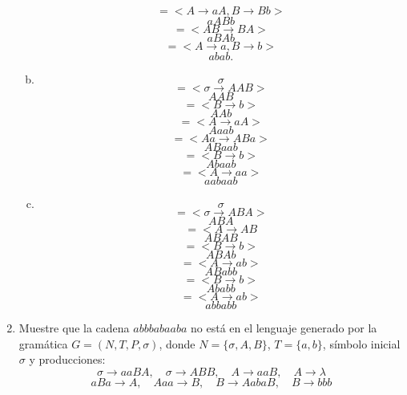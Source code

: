 \documentclass{article}
\begin{document}
\begin{enumerate}[1.]
\begin{enumerate}[a)]
        \[ = <A \rightarrow aA, B \rightarrow Bb>\]
        \[ aABb \]
        \[ = < AB \rightarrow BA > \]
        \[ aBAb \]
        \[ = <A \rightarrow a, B \rightarrow b> \]
        \[ abab. \] 
      \item
        \[ \sigma \]
        \[ = < \sigma \rightarrow AAB > \]
        \[ AAB \]
        \[ =< B \rightarrow b > \]
        \[ AAb \]
        \[ = < A \rightarrow aA > \]
        \[ Aaab \]
        \[ = < Aa \rightarrow ABa > \]
        \[ ABaab \]
        \[ = <B \rightarrow b> \]
        \[ Abaab \]
        \[ =<A \rightarrow aa> \]
        \[ aabaab \]
      \item
        \[ \sigma \]
        \[ = < \sigma \rightarrow ABA >  \]
        \[ ABA \]
        \[ = < A \rightarrow AB \]
        \[ ABAB \]
        \[ = <B \rightarrow b > \]
        \[ ABAb \]
        \[ = <A \rightarrow ab > \]
        \[ ABabb \]
        \[ = < B \rightarrow b> \]
        \[ Ababb \]
        \[ = < A \rightarrow ab >  \]
        \[ abbabb \]
    \end{enumerate}
  \item 
    Muestre que la cadena $abbbabaaba$ no está en el lenguaje generado por la gramática $G = (N,T,P,\sigma)$,
    donde $N = \{ \sigma, A, B \}$, $T= \{ a,b \}$, símbolo inicial $\sigma$ y producciones: 
    \[ \sigma \rightarrow aaBA, \quad \sigma \rightarrow ABB, \quad A \rightarrow aaB, \quad A \rightarrow \lambda \]
    \[ aBa \rightarrow A, \quad Aaa \rightarrow B, \quad B \rightarrow AabaB, \quad B \rightarrow bbb \]


\end{enumerate}
\end{document}
